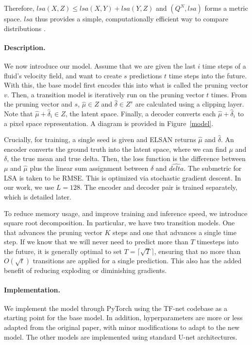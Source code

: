 \documentclass{article}
\begin{document}
Therefore, $lsa(X, Z) \le lsa(X, Y) + lsa(Y, Z)$ and $(Q^N, lsa)$ forms a metric space. $lsa$ thus provides a simple, computationally efficient way to compare distributions \cite{linearsumassignment}.
\paragraph{Description.}
We now introduce our model. Assume that we are given the last $i$ time steps of a fluid's velocity field, and want to create $s$ predictions $t$ time steps into the future. With this, the base model first encodes this into what is called the pruning vector $v$. Then, a transition model is iteratively run on the pruning vector $t$ times. From the pruning vector and $s$, $\hat{\mu} \in Z$ and $\hat{\delta} \in Z^{s}$ are calculated using a clipping layer. Note that $\hat{\mu }+ \hat{\delta}_i \in Z$, the latent space. Finally, a decoder converts each $\hat{\mu} + \hat{\delta}_i$ to a pixel space representation. A diagram is provided in Figure~\ref{model}.

Crucially, for training, a single seed is given and ELSAN returns $\hat{\mu}$ and $\hat{\delta}$. An encoder converts the ground truth into the latent space, where we can find $\mu$ and $\delta$, the true mean and true delta. Then, the loss function is the difference between $\mu$ and $\hat{\mu}$ plus the linear sum assignment between $\delta$ and $\hat{delta}$. The submetric for LSA is taken to be RMSE. This is optimized via stochastic gradient descent. In our work, we use $L = 128$. The encoder and decoder pair is trained separately, which is detailed later.

To reduce memory usage, and improve training and inference speed, we introduce square root decomposition. In particular, we have two transition models. One that advances the pruning vector $K$ steps and one that advances a single time step. If we know that we will never need to predict more than $T$ timesteps into the future, it is generally optimal to set $T = \lceil\sqrt {T}\rceil$, ensuring that no more than $O\left(\sqrt{t}\right)$ transitions are applied for a single prediction. This also has the added benefit of reducing exploding or diminishing gradients.
\paragraph{Implementation.}
We implement the model through PyTorch using the TF-net \cite{Wang2020TF} codebase as a starting point for the base model. In addition, hyperparameters are more or less adapted from the original paper, with minor modifications to adapt to the new model. The other models are implemented using standard U-net architectures.
\end{document}
